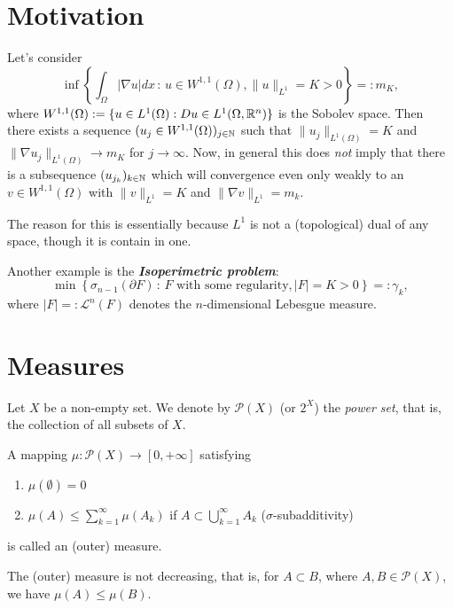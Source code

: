 \setcounter{section}{-1}
\section{Motivation}
Let's  consider
\[
\inf\left\{\int_\Omega |\nabla u|dx \,:\, u \in W^{1,1}(\Omega), \|u\|_{L^1} = K
> 0 \right\} =: m_K,
\]
where $W^{1,1}(\Omega) := \{u \in L^1(\Omega) : Du \in L^1(\Omega, \mathbb{R}^n)\}$ is
the Sobolev space. Then there exists a sequence $(u_j \in
W^{1,1}(\Omega))_{j\in\mathbb{N}}$ such that $\|u_j\|_{L^1(\Omega)}=K$ and $\|\nabla
u_j\|_{L^1(\Omega)} \to m_K$ for $j \to \infty$. Now, in general this does
\emph{not} imply that there is a subsequence $(u_{j_k})_{k\in\mathbb{N}}$ which will
convergence even only weakly to an $v \in W^{1,1}(\Omega)$ with $\|v\|_{L^1} =
K$ and $\|\nabla v \|_{L^1} = m_k$. 

The reason for this is essentially because $L^1$ is not a (topological) dual of
any space, though it is contain in one. 

Another example is the \emph{\textbf{Isoperimetric problem}}:
\[
\min\left\{\sigma_{n-1}(\partial F) \,:\, \text{$F$ with some regularity}, |F| =
K > 0 \right\} =: \gamma_k,
\]
where $|F| =: \mathcal{L}^n(F)$ denotes the $n$-dimensional Lebesgue measure.

\section{Measures}

Let $X$ be a non-empty set. We denote by $\mathcal{P}(X)$ (or $2^X$) the
\emph{power set}, that is, the collection of all subsets of $X$.

\begin{definition}
A mapping $\mu : \mathcal{P}(X) \to [0,+\infty]$ satisfying
\begin{enumerate}[(1)]
\item $\mu(\emptyset) = 0$ 
\item $\mu(A) \leq \sum_{k=1}^\infty \mu(A_k)$ if $A \subset
\bigcup_{k=1}^\infty A_k$ \hfill ($\sigma$-subadditivity)
\end{enumerate}
is called an (outer) measure.
\end{definition}

\begin{remark}
The (outer) measure is not decreasing, that is, for $A\subset B$, where $A,B \in
\mathcal{P}(X)$, we have $\mu(A) \leq \mu(B)$. 
\end{remark}

